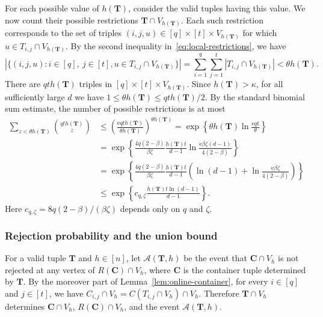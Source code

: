 \documentclass[12pt]{article}
\numberwithin{equation}{section}
\theoremstyle{definition}
\newcommand{\ee}{\mathrm{e}}
\begin{document}
For each possible value of $h(\mathbf T)$, consider the valid tuples having
this value. We now count their possible restrictions
$\mathbf T\cap V_{h(\mathbf T)}$. Each such restriction corresponds to the
set of triples $(i,j,u)\in[q]\times[t]\times V_{h(\mathbf T)}$ for which
$u\in T_{i,j}\cap V_{h(\mathbf T)}$. By the second inequality
in~\eqref{eq:local-restrictions}, we have
\[
 \left|\{(i, j, u) : i \in [q],\ j \in [t],
 u \in T_{i,j} \cap V_{h(\mathbf T)}\}\right|
 = \sum_{i = 1}^q \sum_{j = 1}^t
 |T_{i,j} \cap V_{h(\mathbf T)}| < \theta h(\mathbf T).
\]
There are $qth(\mathbf T)$ triples in
$[q]\times[t]\times V_{h(\mathbf T)}$. Since $h(\mathbf T)>\kappa$, for all
sufficiently large $d$ we have
$1\leq\theta h(\mathbf T)\leq qth(\mathbf T)/2$. By the standard binomial
sum estimate, the number of possible restrictions is at most
\begin{equation}\label{eq:tuple-count}
 \begin{aligned}
 \sum_{z < \theta h(\mathbf T)} \binom{q t h(\mathbf T)}{z}
 & \leq \left(\frac{\ee q t h(\mathbf T)}
 {\theta h(\mathbf T)}\right)^{\theta h(\mathbf T)}
 = \exp\left\{\theta h(\mathbf T)\ln \frac{\ee q t}{\theta}\right\}\\
 &= \exp\left\{\frac{4q(2 - \beta)}{\beta\zeta}
 \frac{h(\mathbf T)t}{d - 1}
 \ln \frac{\ee\beta\zeta(d - 1)}{4(2 - \beta)}\right\}\\
 &= \exp\left\{\frac{4q(2 - \beta)}{\beta\zeta}
 \frac{h(\mathbf T)t}{d - 1}
 \left(\ln(d - 1) + \ln \frac{\ee\beta\zeta}{4(2 - \beta)}\right)\right\}\\
 & \leq \exp\left\{c_{q,\zeta}
 \frac{h(\mathbf T)t\ln(d - 1)}{d - 1}\right\}.
 \end{aligned}
\end{equation}
Here $c_{q,\zeta} = 8q(2 - \beta)/(\beta\zeta)$ depends only on $q$ and
$\zeta$.

\subsubsection{Rejection probability and the union bound}

For a valid tuple $\mathbf T$ and $h\in[n]$, let
$\mathcal A(\mathbf T,h)$ be the event that $\mathbf C\cap V_h$ is not
rejected at any vertex of $R(\mathbf C)\cap V_h$, where $\mathbf C$ is the
container tuple determined by $\mathbf T$. By the moreover part of
Lemma~\ref{lem:online-container}, for every $i\in[q]$ and $j\in[t]$, we have
$C_{i,j}\cap V_h=C(T_{i,j}\cap V_h)\cap V_h$. Therefore
$\mathbf T\cap V_h$ determines $\mathbf C\cap V_h$,
$R(\mathbf C)\cap V_h$, and the event $\mathcal A(\mathbf T,h)$.
\end{document}
